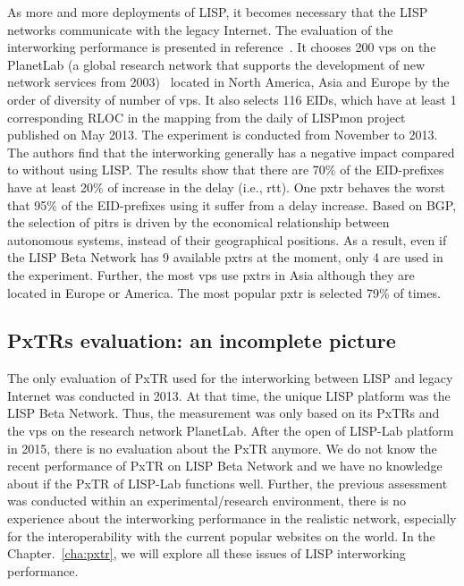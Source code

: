 As more and more deployments of LISP, it becomes necessary that the LISP networks communicate with the legacy Internet. The evaluation of the interworking performance is presented in reference~\cite{coras2014performance}. It chooses 200 \acrshort{vp}s on the PlanetLab (a global research network that supports the development of new network services from 2003)~\cite{PlanetLab} located in North America, Asia and Europe by the order of diversity of number of \acrshort{vp}s. It also selects 116 EIDs, which have at least 1 corresponding RLOC in the mapping from the daily of LISPmon project~\cite{lispmon} published on May  2013. The experiment is conducted from November  to  2013. The authors find that the interworking generally has a negative impact compared to without using LISP. The results show that there are 70\% of the EID-prefixes have at least 20\% of increase in the delay (i.e., \acrfull{rtt}). One \acrshort{pxtr} behaves the worst that 95\% of the EID-prefixes using it suffer from a delay increase. Based on BGP, the selection of \acrshort{pitr}s is driven by the economical relationship between autonomous systems, instead of their geographical positions. As a result, even if the LISP Beta Network has 9 available \acrshort{pxtr}s at the moment, only 4 are used in the experiment. Further, the most \acrshort{vp}s use \acrshort{pxtr}s in Asia although they are located in Europe or America. The most popular \acrshort{pxtr} is selected 79\% of times.

\subsection{PxTRs evaluation: an incomplete picture}
\label{subsec:interworking_missing}
The only evaluation of PxTR used for the interworking between LISP and legacy Internet was conducted in 2013. At that time, the unique LISP platform was the LISP Beta Network. Thus, the measurement was only based on its PxTRs and the \acrshort{vp}s on the research network PlanetLab. After the open of LISP-Lab platform in 2015, there is no evaluation about the PxTR anymore. We do not know the recent performance of PxTR on LISP Beta Network and we have no knowledge about if the PxTR of LISP-Lab functions well. Further, the previous assessment was conducted within an experimental/research environment, there is no experience about the interworking performance in the realistic network, especially for the interoperability with the current popular websites on the world. In the Chapter.~\ref{cha:pxtr}, we will explore all these issues of LISP interworking performance.

